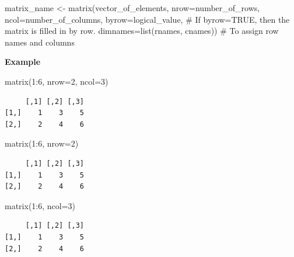 \documentclass[
  letterpaper,
  DIV=11,
  numbers=noendperiod]{scrreprt}
\newenvironment{Shaded}{\begin{snugshade}}{\end{snugshade}}
\newcommand{\AttributeTok}[1]{\textcolor[rgb]{0.40,0.45,0.13}{#1}}
\newcommand{\CommentTok}[1]{\textcolor[rgb]{0.37,0.37,0.37}{#1}}
\newcommand{\DecValTok}[1]{\textcolor[rgb]{0.68,0.00,0.00}{#1}}
\newcommand{\FunctionTok}[1]{\textcolor[rgb]{0.28,0.35,0.67}{#1}}
\newcommand{\NormalTok}[1]{\textcolor[rgb]{0.00,0.23,0.31}{#1}}
\newcommand{\OtherTok}[1]{\textcolor[rgb]{0.00,0.23,0.31}{#1}}
\newcommand{\SpecialCharTok}[1]{\textcolor[rgb]{0.37,0.37,0.37}{#1}}
\begin{document}
\begin{Shaded}
\begin{Highlighting}[]
\NormalTok{matrix\_name }\OtherTok{\textless{}{-}} \FunctionTok{matrix}\NormalTok{(vector\_of\_elements, }
                      \AttributeTok{nrow=}\NormalTok{number\_of\_rows,}
                      \AttributeTok{ncol=}\NormalTok{number\_of\_columns,}
                      \AttributeTok{byrow=}\NormalTok{logical\_value, }\CommentTok{\# If byrow=TRUE, then the matrix is filled in by row.}
                      \AttributeTok{dimnames=}\FunctionTok{list}\NormalTok{(rnames, cnames)) }\CommentTok{\# To assign row names and columns}
\end{Highlighting}
\end{Shaded}

\textbf{Example}

\begin{Shaded}
\begin{Highlighting}[]
\FunctionTok{matrix}\NormalTok{(}\DecValTok{1}\SpecialCharTok{:}\DecValTok{6}\NormalTok{, }\AttributeTok{nrow=}\DecValTok{2}\NormalTok{, }\AttributeTok{ncol=}\DecValTok{3}\NormalTok{)}
\end{Highlighting}
\end{Shaded}

\begin{verbatim}
     [,1] [,2] [,3]
[1,]    1    3    5
[2,]    2    4    6
\end{verbatim}

\begin{Shaded}
\begin{Highlighting}[]
\FunctionTok{matrix}\NormalTok{(}\DecValTok{1}\SpecialCharTok{:}\DecValTok{6}\NormalTok{, }\AttributeTok{nrow=}\DecValTok{2}\NormalTok{)}
\end{Highlighting}
\end{Shaded}

\begin{verbatim}
     [,1] [,2] [,3]
[1,]    1    3    5
[2,]    2    4    6
\end{verbatim}

\begin{Shaded}
\begin{Highlighting}[]
\FunctionTok{matrix}\NormalTok{(}\DecValTok{1}\SpecialCharTok{:}\DecValTok{6}\NormalTok{, }\AttributeTok{ncol=}\DecValTok{3}\NormalTok{)}
\end{Highlighting}
\end{Shaded}

\begin{verbatim}
     [,1] [,2] [,3]
[1,]    1    3    5
[2,]    2    4    6
\end{verbatim}
\end{document}
